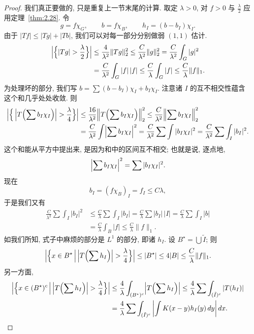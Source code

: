 \begin{proof}
我们真正要做的, 只是重复上一节末尾的计算. 取定 $\lambda>0$, 对 $f>0$ 与 $\frac{\lambda}{2}$ 应用定理~\ref{thm:2.28}. 令
\[
g=f\chi_{G},\qquad b=f\chi_{B},\qquad h_{I}=(b-b_{I})\chi_{I}.
\]
由于 $|Tf|\leq|Tg|+|Tb|$, 我们可以对每一部分分别做弱 $(1,1)$ 估计.
\begin{align*}
\Bigl|\Bigl\{|T g|>\frac{\lambda}{2}\Bigr\}\Bigr|
&\leq\frac{4}{\lambda^{2}}\|T g\|_{2}^{2}
\leq\frac{C}{\lambda^{2}}\|g\|_{2}^{2}=\frac{C}{\lambda^{2}}\int_{G}|g|^{2} \\
&=\frac{C}{\lambda^{2}}\int_{G}|f|\,|f|\leq\frac{C}{\lambda}\int_{G}|f|
\leq\frac{C}{\lambda}\|f\|_{1}.
\end{align*}
为处理坏的部分, 我们写 $b=\sum(b-b_I)\chi_I+b_I\chi_I$. 注意诸 $I$ 的互不相交性蕴含这个和几乎处处收敛. 则
\begin{align*}
\Bigl|\Bigl\{\,\Bigl|T\Bigl(\sum b_{I}\chi_{I}\Bigr)\Bigr|>\frac{\lambda}{4}\Bigr\}\Bigr|
&\leq\frac{16}{\lambda^{2}}\Bigl\|T\Bigl(\sum b_{I}\chi_{I}\Bigr)\Bigr\|_{2}^{2}
\leq\frac{C}{\lambda^{2}}\Bigl\|\sum b_{I}\chi_{I}\Bigr\|_{2}^{2} \\
&=\frac{C}{\lambda^{2}}\int\Bigl|\sum b_{I}\chi_{I}\Bigr|^{2}
=\frac{C}{\lambda^{2}}\sum\int|b_{I}\chi_{I}|^{2}
=\frac{C}{\lambda^{2}}\sum\int_{I}|b_{I}|^{2}.
\end{align*}
这个和能从平方中提出来, 是因为和中的区间互不相交; 也就是说, 逐点地,
\[
\Bigl|\sum b_{I}\chi_{I}\Bigr|^{2}=\sum|b_{I}\chi_{I}|^{2}.
\]
现在
\[
b_{I}=(f\chi_{B})_{I}=f_{I}\leq C\lambda,
\]
于是我们又有
\begin{align*}
\frac{C}{\lambda^{2}}\sum\int_{I}|b_{I}|^{2}
&\leq\frac{C}{\lambda}\sum\int_{I}|b_{I}|
=\frac{C}{\lambda}\sum|b_{I}|\,|I|=\frac{C}{\lambda}\sum\int_{I}|b| \\
&=\frac{C}{\lambda}\int_{B}|f|\leq\frac{C}{\lambda}\|f\|_{1}.
\end{align*}
如我们所知, 式子中麻烦的部分是 $L^1$ 的部分, 即诸 $h_I$. 设 $B^\star=\bigcup\tilde{I}$; 则
\[
\Bigl|\Bigl\{x\in B^{\star}\,\Big|\,\Bigl|T\Bigl(\sum h_{I}\Bigr)\Bigr|>\frac{\lambda}{4}\Bigr\}\Bigr|
\leq|B^{\star}|\leq 4|B|\leq\frac{C}{\lambda}\|f\|_{1}.
\]
另一方面,
\begin{align*}
\Bigl|\Bigl\{x\in(B^{\star})^{c}\,\Big|\,\Bigl|T\Bigl(\sum h_{I}\Bigr)\Bigr|>\frac{\lambda}{4}\Bigr\}\Bigr|
&\leq\frac{4}{\lambda}\int_{(B^{\star})^{c}}\Bigl|T\Bigl(\sum h_{I}\Bigr)\Bigr|
\leq\frac{4}{\lambda}\sum\int_{(\tilde{I})^{c}}|T(h_{I})| \\
&=\frac{4}{\lambda}\sum\int_{(\tilde{I})^{c}}\left|\int K(x-y)h_{I}(y)\,dy\right|dx.

\end{align*}
\end{proof}
